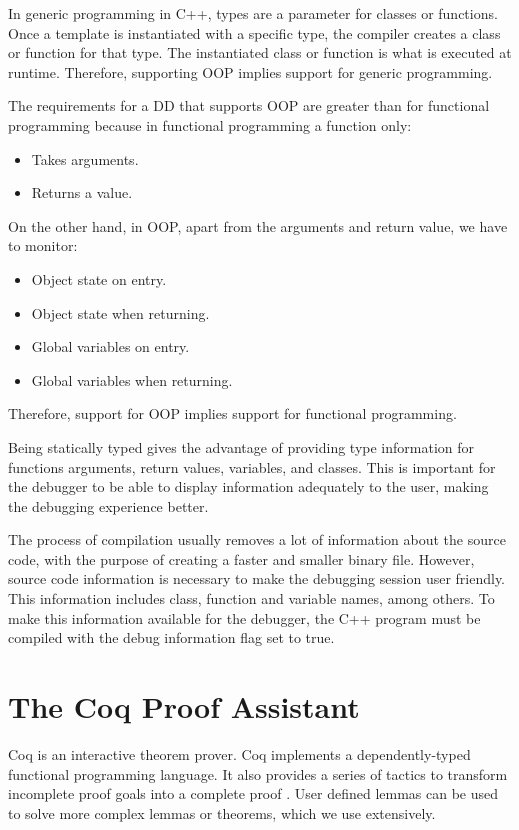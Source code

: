 In generic programming in C++, types are a parameter for classes or functions.
Once a template is instantiated with a specific type, the compiler creates a class or function for that type.
The instantiated class or function is what is executed at runtime. Therefore, supporting OOP implies support for generic programming.

The requirements for a DD that supports OOP are greater than for functional programming because in functional programming a function only:
\begin{itemize}
    \item Takes arguments.
    \item Returns a value.
\end{itemize}
On the other hand, in OOP, apart from the arguments and return value, we have to monitor:
\begin{itemize}
    \item Object state on entry.
    \item Object state when returning.
    \item Global variables on entry.
    \item Global variables when returning.
\end{itemize}
Therefore, support for OOP implies support for functional programming.

Being statically typed gives the advantage of providing type information for functions arguments, return values, variables, and classes. This is important for the debugger to be able to display information adequately to the user, making the debugging experience better.

The process of compilation usually removes a lot of information about the source code, with the purpose of creating a faster and smaller binary file.
However, source code information is necessary to make the debugging session user friendly. This information includes class, function and variable names, among others.
To make this information available for the debugger, the C++ program must be compiled with the debug information flag set to true.
\section{The Coq Proof Assistant}
Coq \cite{coq} is an interactive theorem prover.
Coq implements a dependently-typed functional programming language. It also provides a series of tactics to transform incomplete proof goals into a complete proof \cite{coqTactics}. User defined lemmas can be used to solve more complex lemmas or theorems, which we use extensively. 

